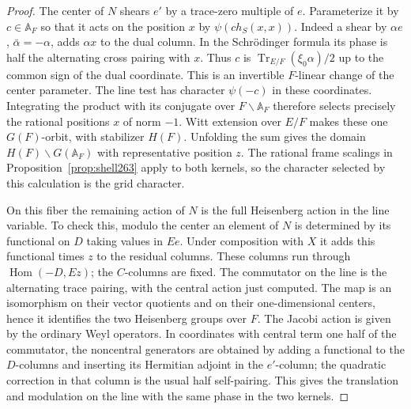 \documentclass[a4paper,11pt]{article}
\theoremstyle{definition}
\theoremstyle{remark}
\numberwithin{equation}{section}
\begin{document}
\begin{proof}
The center of \(N\) shears \(e'\) by a trace-zero multiple
of \(e\). Parameterize it by \(c\in\mathbb A_F\) so that it
acts on the position \(x\) by \(\psi(c h_S(x,x))\).
Indeed a shear by \(\alpha e\), \(\bar\alpha=-\alpha\), adds
\(\alpha x\) to the dual column. In the Schr\"odinger formula
its phase is half the alternating cross pairing with \(x\).
Thus \(c\) is \(\operatorname{Tr}_{E/F}(\xi_0\alpha)/2\)
up to the common sign of the dual coordinate. This is an
invertible \(F\)-linear change of the center parameter. The
line test has character \(\psi(-c)\) in these coordinates.
Integrating the product with its conjugate over \(F\backslash
\mathbb A_F\) therefore selects precisely the rational positions
\(x\) of norm \(-1\). Witt extension over \(E/F\) makes these
one \(G(F)\)-orbit, with stabilizer \(H(F)\). Unfolding the
sum gives the domain \(H(F)\backslash G(\mathbb A_F)\) with
representative position \(z\). The rational frame scalings
in Proposition~\ref{prop:shell263} apply to both kernels, so the
character selected by this calculation is the grid character.

On this fiber the remaining action of \(N\) is the full
Heisenberg action in the line variable. To check this, modulo
the center an element of \(N\) is determined by its functional
on \(D\) taking values in \(Ee\). Under composition with \(X\)
it adds this functional times \(z\) to the residual columns.
These columns run through \(\operatorname{Hom}(-D,Ez)\);
the \(C\)-columns are fixed. The commutator on the line is
the alternating trace pairing, with the central action just
computed. The map is an isomorphism on their vector quotients
and on their one-dimensional centers, hence it identifies the
two Heisenberg groups over \(F\). The Jacobi action is given
by the ordinary Weyl operators. In coordinates with central
term one half of the commutator, the noncentral generators
are obtained by adding a functional to the \(D\)-columns
and inserting its Hermitian adjoint in the \(e'\)-column;
the quadratic correction in that column is the usual half
self-pairing. This gives the translation and modulation on
the line with the same phase in the two kernels.


\end{proof}
\end{document}
